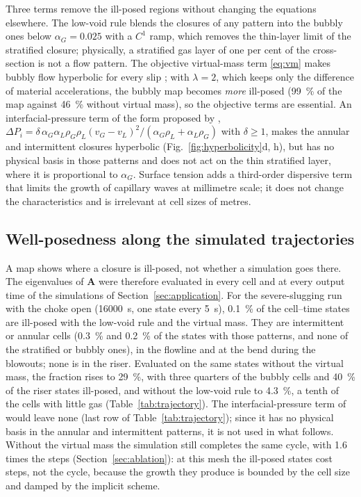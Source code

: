 \documentclass[a4paper,fleqn]{cas-sc}
\newcommand{\aG}{\alpha_G}
\newcommand{\aL}{\alpha_L}
\newcommand{\bA}{\mathbf{A}}
\begin{document}
Three terms remove the ill-posed regions without changing the equations elsewhere. The low-void rule blends the closures of any pattern into the bubbly ones below $\aG = 0.025$ with a $C^1$ ramp, which removes the thin-layer limit of the stratified closure; physically, a stratified gas layer of one per cent of the cross-section is not a flow pattern. The objective virtual-mass term \eqref{eq:vm} makes bubbly flow hyperbolic for every slip \citep{drew1979}; with $\lambda = 2$, which keeps only the difference of material accelerations, the bubbly map becomes \emph{more} ill-posed (\SI{99}{\percent} of the map against \SI{46}{\percent} without virtual mass), so the objective terms are essential. An interfacial-pressure term of the form proposed by \citet{bestion1990}, $\Delta P_i = \delta\, \aG \aL \rho_G \rho_L (v_G - v_L)^2/(\aG\rho_L + \aL\rho_G)$ with $\delta \geq 1$, makes the annular and intermittent closures hyperbolic (Fig.~\ref{fig:hyperbolicity}d, h), but has no physical basis in those patterns and does not act on the thin stratified layer, where it is proportional to $\aG$. Surface tension adds a third-order dispersive term that limits the growth of capillary waves at millimetre scale; it does not change the characteristics and is irrelevant at cell sizes of metres.

\subsection{Well-posedness along the simulated trajectories}\label{sec:trajectories}

A map shows where a closure is ill-posed, not whether a simulation goes there. The eigenvalues of $\bA$ were therefore evaluated in every cell and at every output time of the simulations of Section~\ref{sec:application}. For the severe-slugging run with the choke open (\SI{16000}{\second}, one state every \SI{5}{\second}), \SI{0.1}{\percent} of the cell--time states are ill-posed with the low-void rule and the virtual mass. They are intermittent or annular cells (\SI{0.3}{\percent} and \SI{0.2}{\percent} of the states with those patterns, and none of the stratified or bubbly ones), in the flowline and at the bend during the blowouts; none is in the riser. Evaluated on the same states without the virtual mass, the fraction rises to \SI{29}{\percent}, with three quarters of the bubbly cells and \SI{40}{\percent} of the riser states ill-posed, and without the low-void rule to \SI{4.3}{\percent}, a tenth of the cells with little gas (Table~\ref{tab:trajectory}). The interfacial-pressure term of \citet{bestion1990} would leave none (last row of Table~\ref{tab:trajectory}); since it has no physical basis in the annular and intermittent patterns, it is not used in what follows. Without the virtual mass the simulation still completes the same cycle, with 1.6 times the steps (Section~\ref{sec:ablation}): at this mesh the ill-posed states cost steps, not the cycle, because the growth they produce is bounded by the cell size and damped by the implicit scheme.
\end{document}

